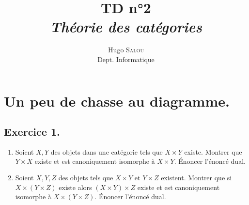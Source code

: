 \documentclass{../../td}
\title{TD n°2\\\itshape Théorie des catégories}
\author{Hugo \textsc{Salou}\\ Dept. Informatique}
\begin{document}
  \maketitle
  
  {
    \small
    \tableofcontents
  }


  \part{Un peu de chasse au diagramme.}
  \chapter{Exercice 1.}

  \begin{slshape}
    \color{deepblue}
    \begin{enumerate}
      \item Soient $X, Y$ des objets dans une catégorie tels que $X \times Y$ existe.
        Montrer que $Y \times X$ existe et est canoniquement isomorphe à $X \times Y$.
        Énoncer l'énoncé dual.
      \item Soient $X,Y,Z$ des objets tels que  $X \times Y$ et $Y \times Z$ existent.
        Montrer que si $X \times (Y \times Z)$ existe alors $(X \times Y) \times Z$ existe et est canoniquement isomorphe à $X \times (Y \times Z)$.
        Énoncer l'énoncé dual.
    \end{enumerate}
  \end{slshape}
\end{document}
